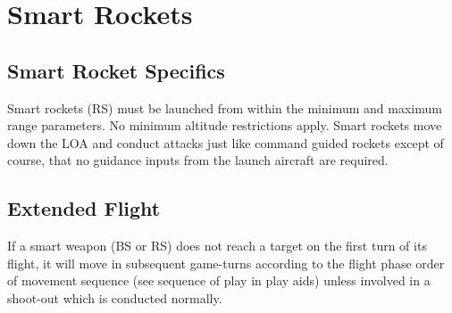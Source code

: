 
\section{Smart Rockets}

\subsection{Smart Rocket Specifics} Smart rockets (RS) must be launched from within the minimum and maximum range parameters. No minimum altitude restrictions apply. Smart rockets move down the LOA and conduct attacks just like command guided rockets except of course, that no guidance inputs from the launch aircraft are required.



\subsection{Extended Flight} If a smart weapon (BS or RS) does not reach a target on the first turn of its flight, it will move in subsequent game-turns according to the flight phase order of movement sequence (see sequence of play in play aids) unless involved in a shoot-out which is conducted normally.



